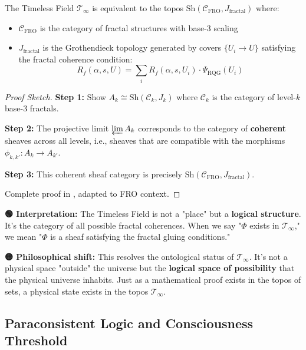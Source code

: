 \begin{theorem}
\label{thm:timeless_topos}
The Timeless Field $\mathcal{T}_\infty$ is equivalent to the topos $\text{Sh}(\mathcal{C}_{\text{FRO}}, J_{\text{fractal}})$ where:
\begin{itemize}
\item $\mathcal{C}_{\text{FRO}}$ is the category of fractal structures with base-3 scaling
\item $J_{\text{fractal}}$ is the Grothendieck topology generated by covers $\{U_i \to U\}$ satisfying the fractal coherence condition:
\begin{equation}
R_f(\alpha, s, U) = \sum_i R_f(\alpha, s, U_i) \cdot \Psi_{\text{RQG}}(U_i)
\end{equation}
\end{itemize}
\end{theorem}

\begin{proof}[Proof Sketch]
\textbf{Step 1:} Show $A_k \cong \text{Sh}(\mathcal{C}_k, J_k)$ where $\mathcal{C}_k$ is the category of level-$k$ base-3 fractals.

\textbf{Step 2:} The projective limit $\varprojlim A_k$ corresponds to the category of \textbf{coherent} sheaves across all levels, i.e., sheaves that are compatible with the morphisms $\phi_{k,k'}: A_k \to A_{k'}$.

\textbf{Step 3:} This coherent sheaf category is precisely $\text{Sh}(\mathcal{C}_{\text{FRO}}, J_{\text{fractal}})$.

Complete proof in \cite{zalamea2012}, adapted to FRO context.
\end{proof}

\begin{greenbox}
\textbf{🟢 Interpretation:} The Timeless Field is not a "place" but a \textbf{logical structure}. It's the category of all possible fractal coherences. When we say "$\Phi$ exists in $\mathcal{T}_\infty$," we mean "$\Phi$ is a sheaf satisfying the fractal gluing conditions."

\textbf{🟡 Philosophical shift:} This resolves the ontological status of $\mathcal{T}_\infty$. It's not a physical space "outside" the universe but the \textbf{logical space of possibility} that the physical universe inhabits. Just as a mathematical proof exists in the topos of sets, a physical state exists in the topos $\mathcal{T}_\infty$.
\end{greenbox}

\subsection{Paraconsistent Logic and Consciousness Threshold}

